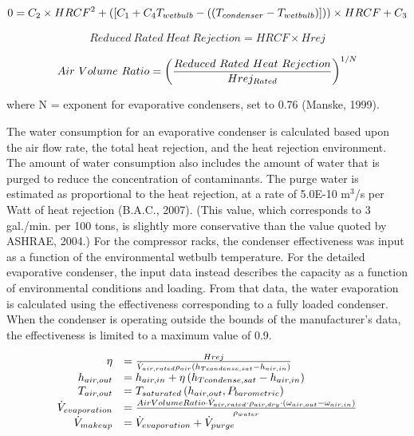 \begin{equation}
0 = C_2 \times HRCF^2 + \left( \left[C_1 + C_4 T_{wetbulb} - \left( \left(T_{condenser} - T_{wetbulb}\right)\right]\right) \right) \times HRCF + C_3
\end{equation}

\begin{equation}
{Reduced~Rated~Heat~Rejection} = HRCF \times Hrej
\end{equation}

\begin{equation}
{Air~Volume~Ratio} = \left(\frac{Reduced~Rated~Heat~Rejection}{Hrej_{Rated}}\right)^{1/N}
\end{equation}

where N = exponent for evaporative condensers, set to 0.76 (Manske, 1999).

The water consumption for an evaporative condenser is calculated based upon the air flow rate, the total heat rejection, and the heat rejection environment. The amount of water consumption also includes the amount of water that is purged to reduce the concentration of contaminants. The purge water is estimated as proportional to the heat rejection, at a rate of 5.0E-10 m\(^{3}\)/s per Watt of heat rejection (B.A.C., 2007). (This value, which corresponds to 3 gal./min. per 100 tons, is slightly more conservative than the value quoted by ASHRAE, 2004.) For the compressor racks, the condenser effectiveness was input as a function of the environmental wetbulb temperature. For the detailed evaporative condenser, the input data instead describes the capacity as a function of environmental conditions and loading. From that data, the water evaporation is calculated using the effectiveness corresponding to a fully loaded condenser. When the condenser is operating outside the bounds of the manufacturer's data, the effectiveness is limited to a maximum value of 0.9.

\begin{equation}
  \begin{array}{rl}
    \eta &= \frac{Hrej}{\dot{V}_{air,rated} \rho_{air} \left(h_{Tcondense,sat} - h_{air,in}\right)} \\
    h_{air,out} &= h_{air,in} + \eta \left(h_{Tcondense,sat} - h_{air,in}\right) \\
    T_{air,out} &= T_{saturated}\left(h_{air,out},P_{barometric}\right) \\
    \dot{V}_{evaporation} &= \frac{{AirVolumeRatio} \cdot \dot{V}_{air,rated} \cdot \rho_{air,dry} \cdot \left(\omega_{air,out} - \omega_{air,in}\right)}{\rho_{water}} \\
    \dot{V}_{makeup} &= \dot{V}_{evaporation} + \dot{V}_{purge}
  \end{array}
\end{equation}

